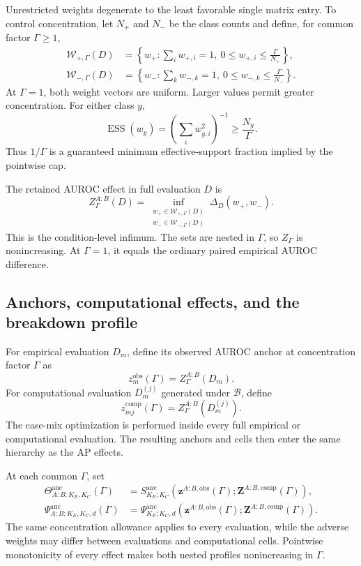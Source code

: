 \documentclass[11pt]{article}
\newcommand{\Boot}{\mathcal{B}}
\newcommand{\Sanc}{S^{\mathrm{anc}}}
\newcommand{\Psianc}{\Psi^{\mathrm{anc}}}
\newcommand{\Thetaanc}{\Theta^{\mathrm{anc}}}
\theoremstyle{remark}
\begin{document}
Unrestricted weights degenerate to the least favorable single matrix entry.
To control concentration, let $N_+$ and $N_-$ be the class counts and define,
for common factor $\Gamma\geq1$,
\begin{align}
\mathcal W_{+,\Gamma}(D)
&=
\left\{w_+:
\sum_iw_{+,i}=1,
\ 0\leq w_{+,i}\leq\frac{\Gamma}{N_+}
\right\},
\label{eq:positive-cap}\\
\mathcal W_{-,\Gamma}(D)
&=
\left\{w_-:
\sum_kw_{-,k}=1,
\ 0\leq w_{-,k}\leq\frac{\Gamma}{N_-}
\right\}.
\label{eq:negative-cap}
\end{align}
At $\Gamma=1$, both weight vectors are uniform. Larger values permit greater
concentration. For either class $y$,
\[
\operatorname{ESS}(w_y)
=
\left(\sum_iw_{y,i}^2\right)^{-1}
\geq
\frac{N_y}{\Gamma}.
\]
Thus $1/\Gamma$ is a guaranteed minimum effective-support fraction implied by
the pointwise cap.

The retained AUROC effect in full evaluation $D$ is
\begin{equation}
Z_\Gamma^{A:B}(D)
=
\inf_{\substack{
w_+\in\mathcal W_{+,\Gamma}(D)\\
w_-\in\mathcal W_{-,\Gamma}(D)}}
\Delta_D(w_+,w_-).
\label{eq:auroc-retained}
\end{equation}
This is the condition-level infimum. The sets are nested in $\Gamma$, so
$Z_\Gamma$ is nonincreasing. At $\Gamma=1$, it equals the ordinary paired
empirical AUROC difference.

\subsection{Anchors, computational effects, and the breakdown profile}

For empirical evaluation $D_m$, define its observed AUROC anchor at
concentration factor $\Gamma$ as
\[
z_m^{\mathrm{obs}}(\Gamma)
=Z_\Gamma^{A:B}(D_m).
\]
For computational evaluation $D_m^{(j)}$ generated under $\Boot$, define
\[
z_{mj}^{\mathrm{comp}}(\Gamma)
=Z_\Gamma^{A:B}(D_m^{(j)}).
\]
The case-mix optimization is performed inside every full empirical or
computational evaluation. The resulting anchors and cells then enter the same
hierarchy as the AP effects.

At each common $\Gamma$, set
\begin{align}
\Thetaanc_{A:B;K_E,K_C}(\Gamma)
&=
\Sanc_{K_E;K_C}
\left(
\mathbf z^{A:B,\mathrm{obs}}(\Gamma);
\mathbf Z^{A:B,\mathrm{comp}}(\Gamma)
\right),
\label{eq:auroc-anchored-magnitude}\\
\Psianc_{A:B;K_E,K_C,d}(\Gamma)
&=
\Psianc_{K_E;K_C,d}
\left(
\mathbf z^{A:B,\mathrm{obs}}(\Gamma);
\mathbf Z^{A:B,\mathrm{comp}}(\Gamma)
\right).
\label{eq:auroc-anchored-survival}
\end{align}
The same concentration allowance applies to every evaluation, while the
adverse weights may differ between evaluations and computational cells.
Pointwise monotonicity of every effect makes both nested profiles nonincreasing
in $\Gamma$.
\end{document}
